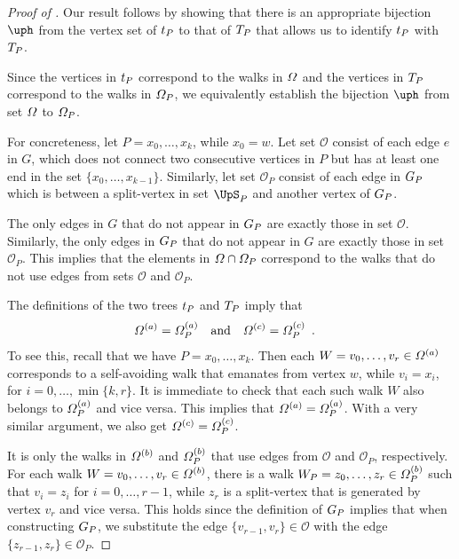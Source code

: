 \documentclass[11pt,reqno]{amsart}
\numberwithin{equation}{section}
\newcommand{\cO}{{\mathcal{O}}}
\newcommand{\blue}[1]{{\color{blue}#1}}
\newcommand{\bluepigment}[1]{{\color{blue(pigment)}#1}}
\newcommand{\bostonuniversityred}[1]{{\color{bostonuniversityred}#1}}
\newcommand{\capri}[1]{{\color{capri}#1}}
\newcommand{\cadmiumgreen}[1]{{\color{cadmiumgreen}#1}}
\newcommand{\electricviolet}[1]{{\color{electricviolet}#1}}
\newcommand{\goldenbrown}[1]{{\color{goldenbrown}#1}}
\newcommand{\heliotrope}[1]{{\color{heliotrope}#1}}
\newcommand{\red}[1]{{\color{red}#1}}
\renewcommand{\blue}[1]{#1}
\renewcommand{\bluepigment}[1]{#1}
\renewcommand{\bostonuniversityred}[1]{#1}
\renewcommand{\capri}[1]{#1}
\renewcommand{\cadmiumgreen}[1]{#1}
\renewcommand{\electricviolet}[1]{#1}
\renewcommand{\goldenbrown}[1]{#1}
\renewcommand{\heliotrope}[1]{#1}
\renewcommand{\red}[1]{#1}
\newcommand{\ke}{\blue{e}}
\newcommand{\ki}{\capri{i}}
\newcommand{\kk}{\bluepigment{k}}
\newcommand{\kP}{\goldenbrown{P}}
\newcommand{\kr}{\bostonuniversityred{r}}%
\newcommand{\kv}{\electricviolet{v}}
\newcommand{\kW}{\blue{W}}
\newcommand{\kw}{\blue{w}}
\newcommand{\kx}{\heliotrope{x}}
\newcommand{\kz}{\cadmiumgreen{z}}
\renewcommand{\ke}{e}
\renewcommand{\ki}{i}
\renewcommand{\kk}{k}
\renewcommand{\kP}{P}
\renewcommand{\kr}{r}
\renewcommand{\kv}{v}
\renewcommand{\kW}{W}
\renewcommand{\kw}{w}
\renewcommand{\kx}{x}
\renewcommand{\kz}{z}
\begin{document}
\begin{proof}[Proof of ]
Our result follows by showing that there is an appropriate bijection $\ABijection$ from  the vertex set of 
$\STw_{\kP}$ to that  of $\XTPw$ that allows us to identify $\STw_{\kP}$ with $\XTPw$. 


Since the vertices in $\STw_{\kP}$ correspond to the walks in $\Omega$ and the vertices in $\XTPw$ 
correspond to the  walks in $\sawpaths_{\kP}$, we equivalently establish the bijection $\ABijection$ from 
set $\Omega$ to $\sawpaths_{\kP}$. 



For concreteness, let $\kP=\kx_0, \ldots, \kx_{\kk}$, while  $\kx_0=\kw$. Let set $\cO$ consist of each 
edge $\ke$ in $G$, which does not connect two consecutive vertices in $\kP$ but has at least one end in the set 
$\{\kx_{0}, \ldots, \kx_{\kk-1}\}$.  Similarly, let set  $\cO_{\kP}$ consist of each  edge in $\gext{G}{\kP}$ 
which is between a split-vertex in set $\ssplit_{\kP}$ and another  vertex of $\gext{G}{\kP}$. 


The only edges in $G$ that do not appear in $\gext{G}{\kP}$ are exactly those in 
set $\cO$. Similarly, the only edges in $\gext{G}{\kP}$ that do not appear in $G$ are exactly those in set 
$\cO_{\kP}$. This implies that  the elements in $\sawpaths \cap \sawpaths_{\kP}$ correspond  to the walks 
that do not use edges from sets $\cO$ and $\cO_{\kP}$. 


The definitions of the two trees $\STw_{\kP}$ and $\XTPw$ imply that  
\begin{align}\nonumber
\sawpaths^{(a)}&=\sawpaths^{(a)}_{\kP} & \textrm{and} &&\sawpaths^{(c)}&=\sawpaths^{(c)}_{\kP} \enspace.
\end{align}
To see this, recall that we have $\kP=\kx_0, \ldots, \kx_{\kk}$. Then each  $\kW=\kv_{0}, \ldots, \kv_{\kr} \in \sawpaths^{(a)}$ 
corresponds to a self-avoiding walk  that emanates from vertex $\kw$, while  $\kv_{\ki}=\kx_{\ki}$, for $\ki=0,\ldots, \min\{\kk,\kr \}$.
It is immediate to check that each such walk $\kW$ also belongs to $\sawpaths^{(a)}_{\kP}$ and vice versa. This implies that
$\sawpaths^{(a)}=\sawpaths^{(a)}_{\kP}$.   With a very similar argument,  we also get  $\sawpaths^{(c)}=\sawpaths^{(c)}_{\kP}$.





It is only the walks in $\Omega^{(b)}$ and $\sawpaths^{(b)}_{\kP}$ that use edges from $\cO$ and 
$\cO_{\kP}$,  respectively.  For each walk $\kW=\kv_0, \ldots, \kv_{\kr} \in \sawpaths^{(b)}$, there is a 
walk $\kW_{\kP}=\kz_0, \ldots, \kz_{\kr} \in \sawpaths^{(b)}_{\kP}$  such that $\kv_{\ki}=\kz_{\ki}$ for $\ki=0,\ldots, \kr-1$, 
while $z_{\kr}$ is a split-vertex that is generated by vertex $v_{\kr}$ and  vice versa.  This holds since 
the definition of  $\gext{G}{\kP}$ implies that when constructing $\gext{G}{\kP}$, we substitute  the edge  
$\{\kv_{\kr-1}, \kv_{\kr}\}\in\cO$ with the edge $\{\kz_{\kr-1}, \kz_{\kr}\}\in \cO_{\kP}$. 



\end{proof}
\end{document}
